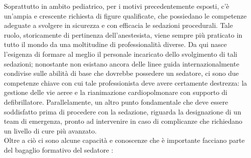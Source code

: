 Soprattutto in ambito pediatrico, per i motivi precedentemente esposti, c'è un'ampia e crescente richiesta di figure qualificate, che possiedano le competenze adeguate a svolgere in sicurezza e con efficacia le sedazioni procedurali. Tale ruolo, storicamente di pertinenza dell'anestesista, viene sempre più praticato in tutto il mondo da una moltitudine di professionalità diverse. Da qui nasce l'esigenza di formare al meglio il personale incaricato dello svolgimento di tali sedazioni; nonostante non esistano ancora delle linee guida internazionalmente condivise sulle abilità di base che dovrebbe possedere un sedatore, ci sono due competenze chiave con cui tale professionista deve avere certamente destrezza: la gestione delle vie aeree e la rianimazione cardiopolmonare con supporto di defibrillatore. Parallelamente, un altro punto fondamentale che deve essere soddisfatto prima di procedere con la sedazione, riguarda la designazione di un team di emergenza, pronto ad intervenire in caso di complicanze che richiedano un livello di cure più avanzato.
\\Oltre a ciò ci sono alcune capacità e conoscenze che è importante facciano parte del bagaglio formativo del sedatore \cite{Simeupsedazione, Berkenbosch2015}: 
